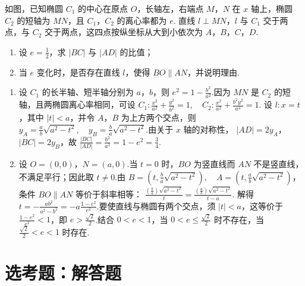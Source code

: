 \begin{problem}
如图，已知椭圆 \(C_{1}\) 的中心在原点 \(O\)，长轴左，右端点 \(M\)，\(N\) 在 \(x\) 轴上，椭圆 \(C_{2}\) 的短轴为 \(MN\)，且 \(C_{1}\)，\(C_{2}\) 的离心率都为 \(e\). 直线 \(l \perp MN\)，\(l\) 与 \(C_{1}\) 交于两点，与 \(C_{2}\) 交于两点，这四点按纵坐标从大到小依次为 \(A\)，\(B\)，\(C\)，\(D\).
\begin{enumerate}
\item 设 \(e = \frac{1}{2}\)，求 \(|BC|\) 与 \(|AD|\) 的比值；
\item 当 \(e\) 变化时，是否存在直线 \(l\)，使得 \(BO \parallel AN\)，并说明理由.
\end{enumerate}

\end{problem}

\begin{solution}
\begin{enumerate}
\item 设 \(C_1\) 的长半轴、短半轴分别为 \(a\)，\(b\)，则
\(\displaystyle e^2=1-\frac{b^2}{a^2}\).因为 \(MN\) 是 \(C_2\) 的短轴，且两椭圆离心率相同，可设
\(\displaystyle C_1:\frac{x^2}{a^2}+\frac{y^2}{b^2}=1,\quad
C_2:\frac{x^2}{a^2}+\frac{b^2y^2}{a^4}=1\).
设 \(l:x=t\)，其中 \(|t|<a\)，并令 \(A\)，\(B\) 为上方两个交点，则
\(\displaystyle y_A=\frac ab\sqrt{a^2-t^2},\quad
y_B=\frac ba\sqrt{a^2-t^2}\).由关于 \(x\) 轴的对称性，
\(\displaystyle |AD|=2y_A\)，\(|BC|=2y_B\)，故
\(\displaystyle \frac{|BC|}{|AD|}=\frac{b^2}{a^2}=1-e^2=\frac34\).
\item 设 \(O=(0,0)\)，\(N=(a,0)\).当 \(t=0\) 时，\(BO\) 为竖直线而 \(AN\) 不是竖直线，不满足平行；因此取 \(t\neq0\).由
\(\displaystyle B=\left(t,\frac ba\sqrt{a^2-t^2}\right),\quad
A=\left(t,\frac ab\sqrt{a^2-t^2}\right)\)，条件 \(BO\parallel AN\) 等价于斜率相等：
\(\displaystyle \frac{(\frac{b}{a})\sqrt{a^2-t^2}}{t}
=\frac{(\frac{a}{b})\sqrt{a^2-t^2}}{t-a}\).
解得
\(\displaystyle t=-\frac{ab^2}{a^2-b^2}
=-a\frac{1-e^2}{e^2}\).要使直线与椭圆有两个交点，须 \(|t|<a\)，这等价于
\(\displaystyle \frac{1-e^2}{e^2}<1\)，即 \(e>\frac{\sqrt2}{2}\).结合 \(0<e<1\)，当 \(0<e\leqslant\frac{\sqrt2}{2}\) 时不存在，当 \(\frac{\sqrt2}{2}<e<1\) 时存在.
\end{enumerate}
\end{solution}

\section{选考题：解答题}

